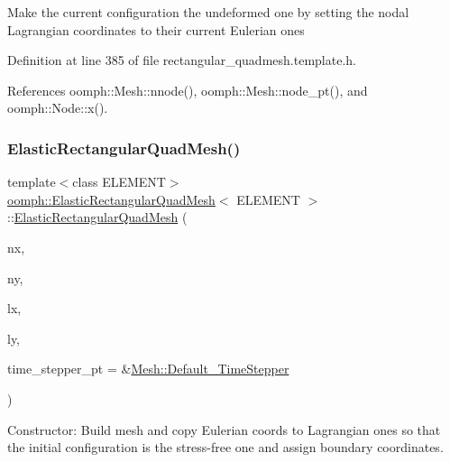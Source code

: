 Make the current configuration the undeformed one by setting the nodal Lagrangian coordinates to their current Eulerian ones 

Definition at line 385 of file rectangular\+\_\+quadmesh.\+template.\+h.



References oomph\+::\+Mesh\+::nnode(), oomph\+::\+Mesh\+::node\+\_\+pt(), and oomph\+::\+Node\+::x().

\mbox{\label{classoomph_1_1ElasticRectangularQuadMesh_a57b701739dcc5c643a1a9bae94a4b7d8}} 
\subsubsection{\texorpdfstring{Elastic\+Rectangular\+Quad\+Mesh()}{ElasticRectangularQuadMesh()}\hspace{0.1cm}{\footnotesize\ttfamily [2/3]}}
{\footnotesize\ttfamily template$<$class E\+L\+E\+M\+E\+NT$>$ \\
\hyperlink{classoomph_1_1ElasticRectangularQuadMesh}{oomph\+::\+Elastic\+Rectangular\+Quad\+Mesh}$<$ E\+L\+E\+M\+E\+NT $>$\+::\hyperlink{classoomph_1_1ElasticRectangularQuadMesh}{Elastic\+Rectangular\+Quad\+Mesh} (\begin{DoxyParamCaption}\item[{const unsigned \&}]{nx,  }\item[{const unsigned \&}]{ny,  }\item[{const double \&}]{lx,  }\item[{const double \&}]{ly,  }\item[{\hyperlink{classoomph_1_1TimeStepper}{Time\+Stepper} $\ast$}]{time\+\_\+stepper\+\_\+pt = {\ttfamily \&\hyperlink{classoomph_1_1Mesh_a12243d0fee2b1fcee729ee5a4777ea10}{Mesh\+::\+Default\+\_\+\+Time\+Stepper}} }\end{DoxyParamCaption})\hspace{0.3cm}{\ttfamily [inline]}}



Constructor\+: Build mesh and copy Eulerian coords to Lagrangian ones so that the initial configuration is the stress-\/free one and assign boundary coordinates. 

